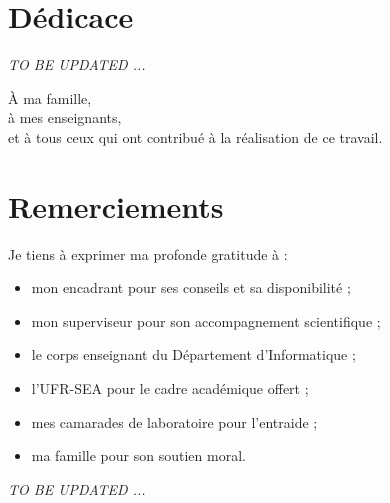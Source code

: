 \documentclass[12pt]{report}
\begin{document}

\newpage
\section*{Dédicace}
\setcounter{page}{2}

\textsl{\colorbox[rgb]{1,1,0}{TO BE UPDATED ...}}

\thispagestyle{fancy}
\vspace{2cm}

\begin{center}
À ma famille,\\
à mes enseignants,\\
et à tous ceux qui ont contribué à la réalisation de ce travail.
\end{center}

\newpage
{}

\section*{Remerciements}

Je tiens à exprimer ma profonde gratitude à :
\begin{itemize}
    \item mon encadrant pour ses conseils et sa disponibilité ;
    \item mon superviseur pour son accompagnement scientifique ;
    \item le corps enseignant du Département d’Informatique ;
    \item l’UFR-SEA pour le cadre académique offert ;
    \item mes camarades de laboratoire pour l’entraide ;
    \item ma famille pour son soutien moral.
\end{itemize}
\textsl{\colorbox[rgb]{1,1,0}{TO BE UPDATED ...}}
\end{document}

